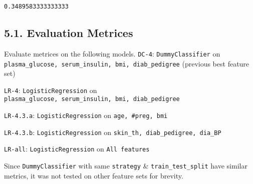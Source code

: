 \documentclass[11pt]{article}
\makeatletter
\newcommand{\boxspacing}{\kern\kvtcb@left@rule\kern\kvtcb@boxsep}
\newcommand{\prompt}[4]{
        \ttfamily\llap{{\color{#2}[#3]:\hspace{3pt}#4}}\vspace{-\baselineskip}
    }
\makeatother
\begin{document}
            \begin{tcolorbox}[breakable, size=fbox, boxrule=.5pt, pad at break*=1mm, opacityfill=0]
\prompt{Out}{outcolor}{194}{\boxspacing}
\begin{Verbatim}[commandchars=\\\{\}]
0.3489583333333333
\end{Verbatim}
\end{tcolorbox}
        
    \hypertarget{evaluation-metrices}{%
\subsection{5.1. Evaluation Metrices}\label{evaluation-metrices}}

Evaluate metrices on the following models. \texttt{DC-4}:
\texttt{DummyClassifier} on
\texttt{plasma\_glucose,\ serum\_insulin,\ bmi,\ diab\_pedigree}
(previous best feature set)

\texttt{LR-4}: \texttt{LogisticRegression} on
\texttt{plasma\_glucose,\ serum\_insulin,\ bmi,\ diab\_pedigree}

\texttt{LR-4.3.a}: \texttt{LogisticRegression} on
\texttt{age,\ \#preg,\ bmi}

\texttt{LR-4.3.b}: \texttt{LogisticRegression} on
\texttt{skin\_th,\ diab\_pedigree,\ dia\_BP}

\texttt{LR-all}: \texttt{LogisticRegression} on \texttt{All\ features}

Since \texttt{DummyClassifier} with same \texttt{strategy} \&
\texttt{train\_test\_split} have similar metrics, it was not tested on
other feature sets for brevity.
\end{document}
